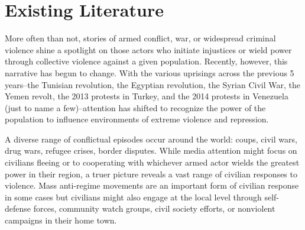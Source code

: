 \section*{Existing Literature}

More often than not, stories of armed conflict, war, or widespread criminal violence shine a spotlight on those actors who initiate injustices or wield power through collective violence against a given population. Recently, however, this narrative has begun to change. With the various uprisings across the previous 5 years--the Tunisian revolution, the Egyptian revolution, the Syrian Civil War, the Yemen revolt, the 2013 protests in Turkey, and the 2014 protests in Venezuela (just to name a few)--attention has shifted to recognize the power of the population to influence environments of extreme violence and repression.

A diverse range of conflictual episodes occur around the world: coups, civil wars, drug wars, refugee crises, border disputes. While media attention might focus on civilians fleeing or to cooperating with whichever armed actor wields the greatest power in their region, a truer picture reveals a vast range of civilian responses to violence.  Mass anti-regime movements are an important form of civilian response in some cases but civilians might also engage at the local level through self-defense forces, community watch groups, civil society efforts, or nonviolent campaigns in their home town. 


